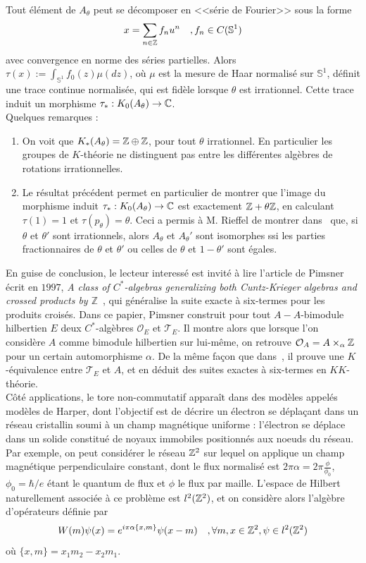 Tout élément de $A_\theta$ peut se décomposer en <<série de Fourier>> sous la forme 
\[x=\sum_{n\in \mathbb Z}f_n u^n\quad, f_n \in C(\mathbb S^1) \]
avec convergence en norme des séries partielles. Alors $\tau(x):=\int_{\mathbb S^1} f_0(z)\mu(dz)$, où $\mu$ est la mesure de Haar normalisé sur $\mathbb S^1$, définit une trace continue normalisée, qui est fidèle lorsque $\theta$ est irrationnel. Cette trace induit un morphisme $\tau_* : K_0(A_\theta)\rightarrow \mathbb C$.\\

Quelques remarques :
\begin{enumerate}
\item On voit que $K_*(A_\theta)=\mathbb Z\oplus \mathbb Z$, pour tout $\theta$ irrationnel. En particulier les groupes de $K$-théorie ne distinguent pas entre les différentes algèbres de rotations irrationnelles. 
\item Le résultat précédent permet en particulier de montrer que l'image du morphisme induit $\tau_* : K_0(A_\theta)\rightarrow \mathbb C$ est exactement $\mathbb Z+\theta \mathbb Z$, en calculant $\tau(1)=1$ et $\tau(p_\theta)=\theta$. Ceci a permis à M. Rieffel de montrer dans~\cite{Rieffel} que, si $\theta$ et $\theta'$ sont irrationnels, alors $A_\theta$ et $A_\theta'$ sont isomorphes ssi les parties fractionnaires de $\theta$ et $\theta'$ ou celles de $\theta$ et $1-\theta'$ sont égales.
\end{enumerate}

En guise de conclusion, le lecteur interessé est invité à lire l'article de Pimsner écrit en $1997$, \textit{A class of $C^*$-algebras generalizing both Cuntz-Krieger algebras and crossed products by $\mathbb Z$}~\cite{Pimsner}, qui généralise la suite exacte à six-termes pour les produits croisés. Dans ce papier, Pimsner construit pour tout $A-A$-bimodule hilbertien $E$ deux $C^*$-algèbres $\mathcal O _E$ et $\mathcal T_E$. Il montre alors que lorsque l'on considère $A$ comme bimodule hilbertien sur lui-même, on retrouve $\mathcal O_A = A\times_\alpha \mathbb Z$ pour un certain automorphisme $\alpha$. De la même façon que dans~\cite{PV}, il prouve une $K$-équivalence entre $\mathcal T _E$ et $A$, et en déduit des suites exactes à six-termes en $KK$-théorie.\\

Côté applications, le tore non-commutatif apparaît dans des modèles appelés modèles de Harper, dont l'objectif est de décrire un électron se déplaçant dans un réseau cristallin soumi à un champ magnétique uniforme :  l'électron se déplace dans un solide constitué de noyaux immobiles positionnés aux noeuds du réseau. Par exemple, on peut considérer le réseau $\mathbb Z^2$ sur lequel on applique un champ magnétique perpendiculaire constant, dont le flux normalisé est $2\pi\alpha=2\pi \frac{\phi}{\phi_0}$, $\phi_0=\hbar/e$ étant le quantum de flux et $\phi$ le flux par maille. L'espace de Hilbert naturellement associée à ce problème est $l^2(\mathbb Z^2)$, et on considère alors l'algèbre d'opérateurs définie par
\[W(m)\psi(x) = e^{i\pi \alpha \{x,m\} }\psi(x-m)\quad, \forall m,x\in \mathbb Z^2,\psi\in l^2(\mathbb Z^2) \]
où $\{x,m\}=x_1 m_2 -x_2 m_1$.\\

